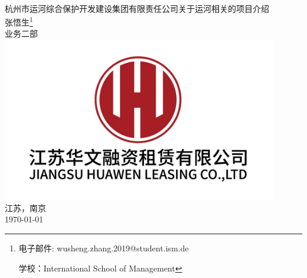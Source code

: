 \documentclass[H:\workspace\担保人财务信息2\杭州大运河\HangZhouText.tex]{subfiles}
\begin{document}
\begin{titlepage}
    \centering
    \vspace{1cm}
     \\
    \vspace{0.5cm}
    \xiaoerhao 杭州市运河综合保护开发建设集团有限责任公司关于运河相关的项目介绍 \\
    \vspace{0.5cm}
    \xiaoerhao 张悟生\footnote{电子邮件: wusheng.zhang.2019@student.ism.de \par 
    学校：International School of Management}\\
    业务二部 \\
    \centering
    \includegraphics[width=0.9\textwidth]{logo.png}\\
    \normalsize 江苏，南京 \\ 
    \today
\end{titlepage}
\end{document}
